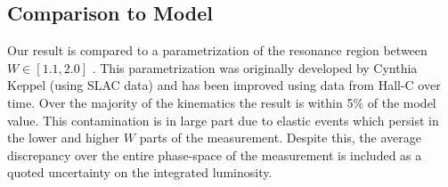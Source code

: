 \subsection{Comparison to Model}
Our result is compared to a parametrization of the resonance region between $W \in [1.1, 2.0]$ \cite{theses-keppel:1994}.  This parametrization was originally developed by Cynthia Keppel (using SLAC data) and has been improved using data from Hall-C over time.  Over the majority of the kinematics the result is within 5\% of the model value.  This contamination is in large part due to elastic events which persist in the lower and higher $W$ parts of the measurement.  Despite this, the average discrepancy over the entire phase-space of the measurement is included as a quoted uncertainty on the integrated luminosity.  



%
%


